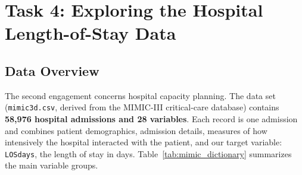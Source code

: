 
\section{Task 4: Exploring the Hospital Length-of-Stay Data}

\subsection{Data Overview}
The second engagement concerns hospital capacity planning. The data set
(\texttt{mimic3d.csv}, derived from the MIMIC-III critical-care database)
contains \textbf{58{,}976 hospital admissions and 28 variables}. Each record is
one admission and combines patient demographics, admission details, measures
of how intensively the hospital interacted with the patient, and our target
variable: \texttt{LOSdays}, the length of stay in days.
Table~\ref{tab:mimic_dictionary} summarizes the main variable groups.

